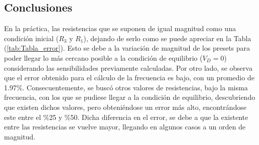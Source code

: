 \subsection{Conclusiones}

En la práctica, las resistencias que se suponen de igual magnitud como una condición inicial ($R_3$ y $R_1$), dejando de serlo como se puede apreciar en la Tabla (\ref{tab:Tabla_error}). Esto se debe a la variación de magnitud de los presets para poder llegar lo más cercano posible a la condición de equilibrio ($V_D=0$) considerando las sensibilidades previamente calculadas. Por otro lado, se observa que el error obtenido para el cálculo de la frecuencia es bajo, con un promedio de 1.97\%. Consecuentemente, se buscó otros valores de resistencias, bajo la misma frecuencia, con los que se pudiese llegar a la condición de equilibrio, descubriendo que existen dichos valores, pero obteniéndose un error más alto, encontrándose este entre el \%25 y \%50. Dicha diferencia en el error, se debe a que la existente entre las resistencias se vuelve mayor, llegando en algunos casos a un orden de magnitud. 
